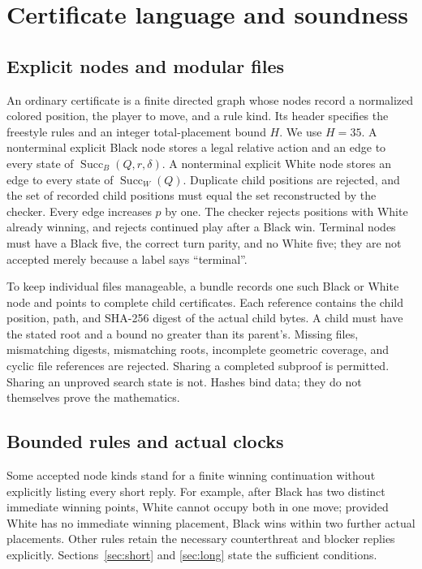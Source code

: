 \documentclass[11pt]{article}
\theoremstyle{definition}
\theoremstyle{remark}
\newcommand{\Succ}{\operatorname{Succ}}
\begin{document}
\section{Certificate language and soundness}
\label{sec:cert}
\subsection{Explicit nodes and modular files}
An ordinary certificate is a finite directed graph whose nodes record a
normalized colored position, the player to move, and a rule kind. Its
header specifies the freestyle rules and an integer total-placement bound
$H$. We use $H=35$. A nonterminal explicit Black node stores a legal
relative action and an edge to every state of
$\Succ_B(Q,r,\delta)$. A nonterminal explicit White node stores an edge
to every state of $\Succ_W(Q)$. Duplicate child positions are rejected,
and the set of recorded child positions must equal the set reconstructed
by the checker. Every edge increases $p$ by one. The checker rejects
positions with White already winning, and rejects continued play after a
Black win. Terminal nodes must have a Black five, the correct turn parity,
and no White five; they are not accepted merely because a label says
``terminal''.

To keep individual files manageable, a bundle records one such Black or
White node and points to complete child certificates. Each reference
contains the child position, path, and SHA-256 digest of the actual child
bytes. A child must have the stated root and a bound no greater than its
parent's. Missing files, mismatching digests, mismatching roots, incomplete
geometric coverage, and cyclic file references are rejected. Sharing a
completed subproof is permitted. Sharing an unproved search state is not.
Hashes bind data; they do not themselves prove the mathematics.

\subsection{Bounded rules and actual clocks}
Some accepted node kinds stand for a finite winning continuation without
explicitly listing every short reply. For example, after Black has two
distinct immediate winning points, White cannot occupy both in one move;
provided White has no immediate winning placement, Black wins within two
further actual placements. Other rules retain the necessary counterthreat
and blocker replies explicitly. Sections~\ref{sec:short} and
\ref{sec:long} state the sufficient conditions.
\end{document}
